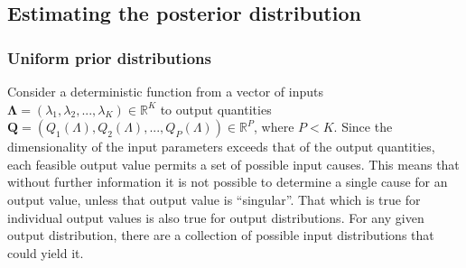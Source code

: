 \documentclass[10pt,letterpaper]{article}
\newcommand{\R}{\mathbb{R}}
\begin{document}
\subsection{Estimating the posterior distribution}
\label{sec:methods}

\subsubsection{Uniform prior distributions}
\label{sec:uniform_priors}

Consider a deterministic function from a vector of inputs $\boldsymbol{\Lambda} = (\lambda_1, \lambda_2, ..., \lambda_K) \in \R^K$ to output quantities $\boldsymbol{Q} = \left(Q_1(\Lambda), Q_2(\Lambda), ..., Q_P(\Lambda) \right) \in \R^P$, where $P<K$. Since the dimensionality of the input parameters exceeds that of the output quantities, each feasible output value permits a set of possible input causes. This means that without further information it is not possible to determine a single cause for an output value, unless that output value is ``singular''. That which is true for individual output values is also true for output distributions. For any given output distribution, there are a collection of possible input distributions that could yield it.
\end{document}
